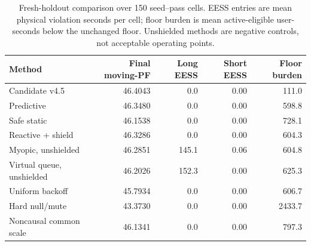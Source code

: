 \begin{table}[t]
\caption{Fresh-holdout comparison over 150 seed--pass cells. EESS entries are mean physical violation seconds per cell; floor burden is mean active-eligible user-seconds below the unchanged floor. Unshielded methods are negative controls, not acceptable operating points.}
\label{tab:method-comparison-full}
\centering
\footnotesize
\setlength{\tabcolsep}{4.6pt}
\renewcommand{\arraystretch}{1.06}
\begin{tabular}{@{}lrrrr@{}}
\toprule
Method & Final moving-PF & Long EESS & Short EESS & Floor burden\\
\midrule
Candidate v4.5 & 46.4043 & 0.0 & 0.00 & 111.0\\
Predictive & 46.3480 & 0.0 & 0.00 & 598.8\\
Safe static & 46.1538 & 0.0 & 0.00 & 728.1\\
Reactive + shield & 46.3286 & 0.0 & 0.00 & 604.3\\
Myopic, unshielded & 46.2851 & 145.1 & 0.06 & 604.8\\
Virtual queue, unshielded & 46.2026 & 152.3 & 0.00 & 625.3\\
Uniform backoff & 45.7934 & 0.0 & 0.00 & 606.7\\
Hard null/mute & 43.3730 & 0.0 & 0.00 & 2433.7\\
Noncausal common scale & 46.1341 & 0.0 & 0.00 & 797.3\\
\bottomrule
\end{tabular}
\end{table}

